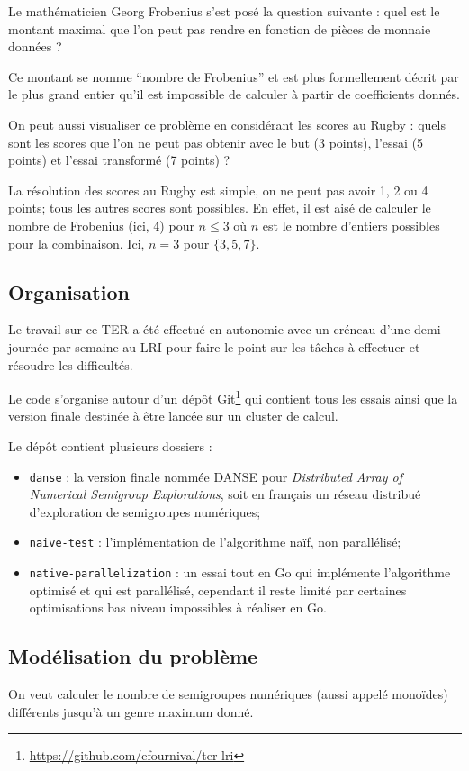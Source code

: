 \documentclass[12pt,a4paper]{article}
\let\leq\leqslant
\begin{document}
Le mathématicien Georg Frobenius s'est posé la question suivante : quel est le montant maximal que l'on peut pas rendre en fonction de pièces de monnaie données ?

Ce montant se nomme ``nombre de Frobenius'' et est plus formellement décrit par le plus grand entier qu'il est impossible de calculer à partir de coefficients donnés.

On peut aussi visualiser ce problème en considérant les scores au Rugby : quels sont les scores que l'on ne peut pas obtenir avec le but (3 points), l'essai (5 points) et l'essai transformé (7 points) ?

La résolution des scores au Rugby est simple, on ne peut pas avoir 1, 2 ou 4 points; tous les autres scores sont possibles. En effet, il est aisé de calculer le nombre de Frobenius (ici, 4) pour $n \leq 3$ où $n$ est le nombre d'entiers possibles pour la combinaison. Ici, $n = 3$ pour $\{3,5,7\}$.

\subsection*{Organisation}
Le travail sur ce TER a été effectué en autonomie avec un créneau d'une demi-journée par semaine au LRI pour faire le point sur les tâches à effectuer et résoudre les difficultés.

Le code s'organise autour d'un dépôt Git\footnote{\url{https://github.com/efournival/ter-lri}} qui contient tous les essais ainsi que la version finale destinée à être lancée sur un cluster de calcul.

Le dépôt contient plusieurs dossiers :
\begin{itemize}
	\item	\texttt{danse} : la version finale nommée DANSE pour \emph{Distributed Array of Numerical Semigroup Explorations}, soit en français un réseau distribué d'exploration de semigroupes numériques;
	\item	\texttt{naive-test} : l'implémentation de l'algorithme naïf, non parallélisé;
	\item	\texttt{native-parallelization} : un essai tout en Go qui implémente l'algorithme optimisé et qui est parallélisé, cependant il reste limité par certaines optimisations bas niveau impossibles à réaliser en Go.
\end{itemize}

\subsection*{Modélisation du problème}
On veut calculer le nombre de semigroupes numériques (aussi appelé monoïdes) différents jusqu'à un genre maximum donné.
\end{document}
